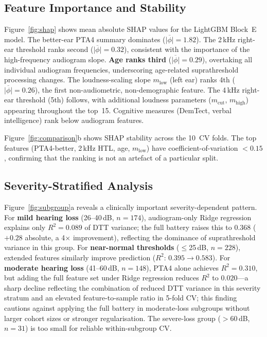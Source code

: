 \documentclass[12pt,a4paper]{article}
\begin{document}
\subsection{Feature Importance and Stability}

Figure~\ref{fig:shap} shows mean absolute SHAP values for the LightGBM
Block~E model.  The better-ear PTA4 summary dominates
($\overline{|\phi|}=1.82$).  The 2\,kHz right-ear threshold ranks second
($\overline{|\phi|}=0.32$), consistent with the importance of the
high-frequency audiogram slope\cite{vanRooij1990HL}.  \textbf{Age ranks
third} ($\overline{|\phi|}=0.29$), overtaking all individual audiogram
frequencies, underscoring age-related suprathreshold processing
changes\cite{Wingfield2005AgeSIN}.  The loudness-scaling slope $m_\text{low}$
(left ear) ranks 4th ($\overline{|\phi|}=0.26$), the first non-audiometric,
non-demographic feature.  The 4\,kHz right-ear threshold (5th) follows,
with additional loudness parameters ($m_\text{cut}$, $m_\text{high}$)
appearing throughout the top~15.  Cognitive measures (DemTect, verbal
intelligence) rank below audiogram features.

Figure~\ref{fig:comparison}b shows SHAP stability across the 10~CV folds.
The top features (PTA4-better, 2\,kHz HTL, age, $m_\text{low}$) have
coefficient-of-variation $<0.15$, confirming that the ranking is not an
artefact of a particular split.

\subsection{Severity-Stratified Analysis}

Figure~\ref{fig:subgroup}a reveals a clinically important severity-dependent
pattern.  For \textbf{mild hearing loss} (26--40\,dB, $n=174$),
audiogram-only Ridge regression explains only $R^2=0.089$ of DTT variance;
the full battery raises this to $0.368$ ($+0.28$ absolute, a 4$\times$
improvement), reflecting the dominance of suprathreshold variance in this
group.  For \textbf{near-normal thresholds} ($\leq$25\,dB, $n=228$), extended
features similarly improve prediction ($R^2$: $0.395\to0.583$).  For
\textbf{moderate hearing loss} (41--60\,dB, $n=148$), PTA4 alone achieves
$R^2=0.310$, but adding the full feature set under Ridge regression reduces
$R^2$ to $0.020$---a sharp decline reflecting the combination of reduced
DTT variance in this severity stratum and an elevated feature-to-sample
ratio in 5-fold CV; this finding cautions against applying the full battery
in moderate-loss subgroups without larger cohort sizes or stronger
regularisation.  The severe-loss group ($>$60\,dB, $n=31$) is too small for
reliable within-subgroup CV.
\end{document}
